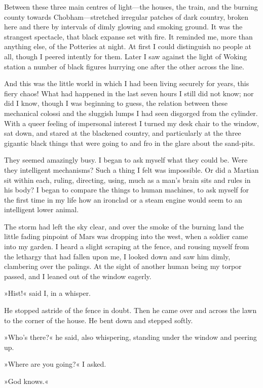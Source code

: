 Between these three main centres of light—the houses, the train, and the burning county towards Chobham—stretched irregular patches of dark country, broken here and there by intervals of dimly glowing and smoking ground. It was the strangest spectacle, that black expanse set with fire. It reminded me, more than anything else, of the Potteries at night. At first I could distinguish no people at all, though I peered intently for them. Later I saw against the light of Woking station a number of black figures hurrying one after the other across the line.

And this was the little world in which I had been living securely for years, this fiery chaos! What had happened in the last seven hours I still did not know; nor did I know, though I was beginning to guess, the relation between these mechanical colossi and the sluggish lumps I had seen disgorged from the cylinder. With a queer feeling of impersonal interest I turned my desk chair to the window, sat down, and stared at the blackened country, and particularly at the three gigantic black things that were going to and fro in the glare about the sand-pits.

They seemed amazingly busy. I began to ask myself what they could be. Were they intelligent mechanisms? Such a thing I felt was impossible. Or did a Martian sit within each, ruling, directing, using, much as a man's brain sits and rules in his body? I began to compare the things to human machines, to ask myself for the first time in my life how an ironclad or a steam engine would seem to an intelligent lower animal.

The storm had left the sky clear, and over the smoke of the burning land the little fading pinpoint of Mars was dropping into the west, when a soldier came into my garden. I heard a slight scraping at the fence, and rousing myself from the lethargy that had fallen upon me, I looked down and saw him dimly, clambering over the palings. At the sight of another human being my torpor passed, and I leaned out of the window eagerly.

»Hist!« said I, in a whisper.

He stopped astride of the fence in doubt. Then he came over and across the lawn to the corner of the house. He bent down and stepped softly.

»Who's there?« he said, also whispering, standing under the window and peering up.

»Where are you going?« I asked.

»God knows.«

